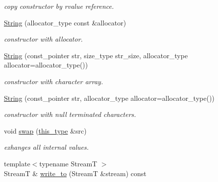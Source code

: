 \begin{DoxyCompactItemize}
\begin{DoxyCompactList}\small\item\em copy constructor by rvalue reference. \end{DoxyCompactList}\item 
\hypertarget{classhryky_1_1_string_a152a6a4ba727611a34dbeae7538fc0eb}{\hyperlink{classhryky_1_1_string_a152a6a4ba727611a34dbeae7538fc0eb}{String} (allocator\-\_\-type const \&allocator)}\label{classhryky_1_1_string_a152a6a4ba727611a34dbeae7538fc0eb}

\begin{DoxyCompactList}\small\item\em constructor with allocator. \end{DoxyCompactList}\item 
\hyperlink{classhryky_1_1_string_a4b0a859218ad9a38373e75279d0509ed}{String} (const\-\_\-pointer str, size\-\_\-type str\-\_\-size, allocator\-\_\-type allocator=allocator\-\_\-type())
\begin{DoxyCompactList}\small\item\em constructor with character array. \end{DoxyCompactList}\item 
\hypertarget{classhryky_1_1_string_a6b69d30c7062d8f4fff138f6ad85150d}{\hyperlink{classhryky_1_1_string_a6b69d30c7062d8f4fff138f6ad85150d}{String} (const\-\_\-pointer str, allocator\-\_\-type allocator=allocator\-\_\-type())}\label{classhryky_1_1_string_a6b69d30c7062d8f4fff138f6ad85150d}

\begin{DoxyCompactList}\small\item\em constructor with null terminated characters. \end{DoxyCompactList}\item 
\hypertarget{classhryky_1_1_string_a5ff47f11c86f2cf71e7e2d1427c1474b}{void \hyperlink{classhryky_1_1_string_a5ff47f11c86f2cf71e7e2d1427c1474b}{swap} (\hyperlink{classhryky_1_1_string}{this\-\_\-type} \&src)}\label{classhryky_1_1_string_a5ff47f11c86f2cf71e7e2d1427c1474b}

\begin{DoxyCompactList}\small\item\em exhanges all internal values. \end{DoxyCompactList}\item 
\hypertarget{classhryky_1_1_string_a5632cb3b6a55de35a0d2c03ddbe8f75e}{{\footnotesize template$<$typename Stream\-T $>$ }\\Stream\-T \& \hyperlink{classhryky_1_1_string_a5632cb3b6a55de35a0d2c03ddbe8f75e}{write\-\_\-to} (Stream\-T \&stream) const }\label{classhryky_1_1_string_a5632cb3b6a55de35a0d2c03ddbe8f75e}


\end{DoxyCompactItemize}
